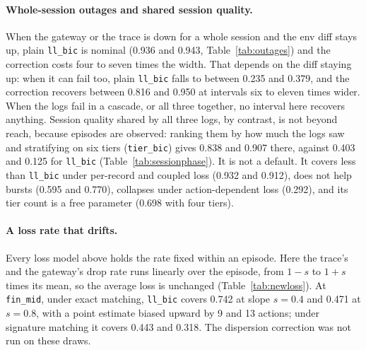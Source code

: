 \documentclass[11pt]{article}
\begin{document}
\paragraph{Whole-session outages and shared session quality.}
When the gateway or the trace is down for a whole session and the env diff stays
up, plain \texttt{ll\_bic} is nominal (0.936 and 0.943, Table~\ref{tab:outages})
and the correction costs four to seven times the width. That depends on the diff
staying up: when it can fail too, plain \texttt{ll\_bic} falls to between 0.235
and 0.379, and the correction recovers between 0.816 and 0.950 at intervals six
to eleven times wider. When the logs fail in a cascade, or all three together, no
interval here recovers anything. Session quality shared by all three logs, by
contrast, is not beyond reach, because episodes are observed: ranking them by how
much the logs saw and stratifying on six tiers (\texttt{tier\_bic}) gives 0.838
and 0.907 there, against 0.403 and 0.125 for \texttt{ll\_bic}
(Table~\ref{tab:sessionphase}). It is not a default. It covers less than
\texttt{ll\_bic} under per-record and coupled loss (0.932 and 0.912), does not
help bursts (0.595 and 0.770), collapses under action-dependent loss (0.292), and
its tier count is a free parameter (0.698 with four tiers).

\paragraph{A loss rate that drifts.}
Every loss model above holds the rate fixed within an episode. Here the trace's and
the gateway's drop rate runs linearly over the episode, from $1 - s$ to $1 + s$
times its mean, so the average loss is unchanged (Table~\ref{tab:newloss}). At
\texttt{fin\_mid}, under exact matching, \texttt{ll\_bic} covers 0.742 at slope
$s = 0.4$ and 0.471 at $s = 0.8$, with a point estimate biased upward by 9 and 13
actions; under signature matching it covers 0.443 and 0.318. The dispersion
correction was not run on these draws.
\end{document}
